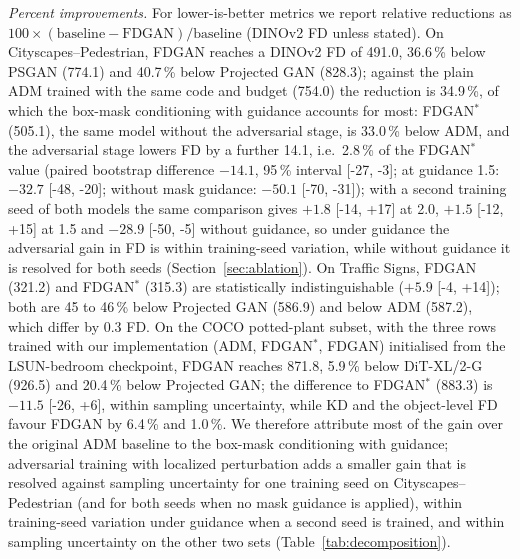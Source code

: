 
\noindent\emph{Percent improvements.} For lower-is-better metrics we report relative reductions as $100\times(\text{baseline}-\text{FDGAN})/\text{baseline}$ (DINOv2 FD unless stated). On Cityscapes--Pedestrian, FDGAN reaches a DINOv2 FD of 491.0, 36.6\,\% below PSGAN (774.1) and 40.7\,\% below Projected GAN (828.3); against the plain ADM trained with the same code and budget (754.0) the reduction is 34.9\,\%, of which the box-mask conditioning with guidance accounts for most: FDGAN$^{\ast}$ (505.1), the same model without the adversarial stage, is 33.0\,\% below ADM, and the adversarial stage lowers FD by a further 14.1, i.e.\ 2.8\,\% of the FDGAN$^{\ast}$ value (paired bootstrap difference $-14.1$, 95\,\% interval [-27, -3]; at guidance 1.5: $-32.7$ [-48, -20]; without mask guidance: $-50.1$ [-70, -31]); with a second training seed of both models the same comparison gives $+1.8$ [-14, +17] at 2.0, $+1.5$ [-12, +15] at 1.5 and $-28.9$ [-50, -5] without guidance, so under guidance the adversarial gain in FD is within training-seed variation, while without guidance it is resolved for both seeds (Section~\ref{sec:ablation}). On Traffic Signs, FDGAN (321.2) and FDGAN$^{\ast}$ (315.3) are statistically indistinguishable ($+5.9$ [-4, +14]); both are 45 to 46\,\% below Projected GAN (586.9) and below ADM (587.2), which differ by 0.3 FD. On the COCO potted-plant subset, with the three rows trained with our implementation (ADM, FDGAN$^{\ast}$, FDGAN) initialised from the LSUN-bedroom checkpoint, FDGAN reaches 871.8, 5.9\,\% below DiT-XL/2-G (926.5) and 20.4\,\% below Projected GAN; the difference to FDGAN$^{\ast}$ (883.3) is $-11.5$ [-26, +6], within sampling uncertainty, while KD and the object-level FD favour FDGAN by 6.4\,\% and 1.0\,\%. We therefore attribute most of the gain over the original ADM baseline to the box-mask conditioning with guidance; adversarial training with localized perturbation adds a smaller gain that is resolved against sampling uncertainty for one training seed on Cityscapes--Pedestrian (and for both seeds when no mask guidance is applied), within training-seed variation under guidance when a second seed is trained, and within sampling uncertainty on the other two sets (Table~\ref{tab:decomposition}).
